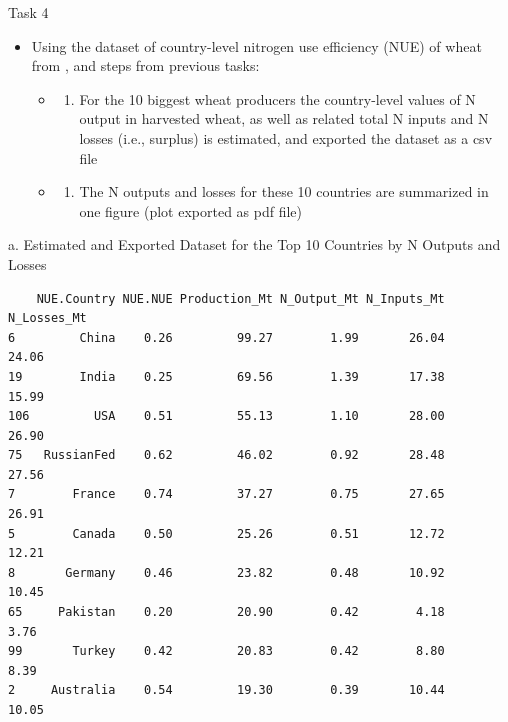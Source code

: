 \documentclass[
  ignorenonframetext,
  aspectratio=169,
]{beamer}
\providecommand{\tightlist}{%
  \setlength{\itemsep}{0pt}\setlength{\parskip}{0pt}}\usepackage{longtable,booktabs,array}
\begin{document}
\begin{frame}{Task 4}
\protect\hypertarget{task-4}{}
\begin{itemize}[<+->]
\item
  Using the dataset of country-level nitrogen use efficiency (NUE) of
  wheat from \citep{zhang_managing_2015}, and steps from previous tasks:

  \begin{itemize}[<+->]
  \item
    \begin{enumerate}[<+->]
    [a.]
    \tightlist
    \item
      For the 10 biggest wheat producers the country-level values of N
      output in harvested wheat, as well as related total N inputs and N
      losses (i.e., surplus) is estimated, and exported the dataset as a
      csv file
    \end{enumerate}
  \item
    \begin{enumerate}[<+->]
    [a.]
    \setcounter{enumi}{1}
    \tightlist
    \item
      The N outputs and losses for these 10 countries are summarized in
      one figure (plot exported as pdf file)
    \end{enumerate}
  \end{itemize}
\end{itemize}
\end{frame}

\begin{frame}[fragile]{a. Estimated and Exported Dataset for the Top 10
Countries by N Outputs and Losses}
\protect\hypertarget{a.-estimated-and-exported-dataset-for-the-top-10-countries-by-n-outputs-and-losses}{}
\linespread{0.5}

\linespread{2}

\linespread{0.5}

\linespread{2}

\linespread{0.5}

\begin{verbatim}
    NUE.Country NUE.NUE Production_Mt N_Output_Mt N_Inputs_Mt N_Losses_Mt
6         China    0.26         99.27        1.99       26.04       24.06
19        India    0.25         69.56        1.39       17.38       15.99
106         USA    0.51         55.13        1.10       28.00       26.90
75   RussianFed    0.62         46.02        0.92       28.48       27.56
7        France    0.74         37.27        0.75       27.65       26.91
5        Canada    0.50         25.26        0.51       12.72       12.21
8       Germany    0.46         23.82        0.48       10.92       10.45
65     Pakistan    0.20         20.90        0.42        4.18        3.76
99       Turkey    0.42         20.83        0.42        8.80        8.39
2     Australia    0.54         19.30        0.39       10.44       10.05
\end{verbatim}

\linespread{2}
\end{frame}
\end{document}
